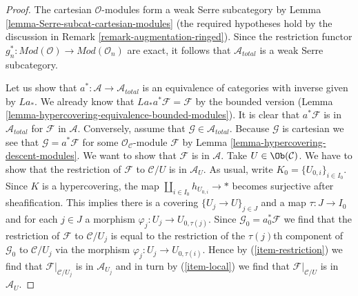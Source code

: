 \begin{proof}
The cartesian $\mathcal{O}$-modules form a weak Serre subcategory by
Lemma \ref{lemma-Serre-subcat-cartesian-modules}
(the required hypotheses hold by the discussion in
Remark \ref{remark-augmentation-ringed}).
Since the restriction functor
$g_n^* : \textit{Mod}(\mathcal{O}) \to \textit{Mod}(\mathcal{O}_n)$
are exact, it follows that $\mathcal{A}_{total}$ is a weak Serre
subcategory.

\medskip\noindent
Let us show that $a^* : \mathcal{A} \to \mathcal{A}_{total}$
is an equivalence of categories with inverse given by $La_*$.
We already know that $La_*a^*\mathcal{F} = \mathcal{F}$ by the
bounded version
(Lemma \ref{lemma-hypercovering-equivalence-bounded-modules}).
It is clear that $a^*\mathcal{F}$ is in $\mathcal{A}_{total}$
for $\mathcal{F}$ in $\mathcal{A}$. Conversely, assume that
$\mathcal{G} \in \mathcal{A}_{total}$. Because $\mathcal{G}$
is cartesian we see that $\mathcal{G} = a^*\mathcal{F}$
for some $\mathcal{O}_\mathcal{C}$-module $\mathcal{F}$ by
Lemma \ref{lemma-hypercovering-descent-modules}.
We want to show that $\mathcal{F}$ is in $\mathcal{A}$.
Take $U \in \Ob(\mathcal{C})$. We have to show that the
restriction of $\mathcal{F}$ to $\mathcal{C}/U$ is in $\mathcal{A}_U$.
As usual, write $K_0 = \{U_{0, i}\}_{i \in I_0}$.
Since $K$ is a hypercovering, the map $\coprod_{i \in I_0} h_{U_{0, i}} \to *$
becomes surjective after sheafification. This implies there is
a covering $\{U_j \to U\}_{j \in J}$ and a map $\tau : J \to I_0$
and for each $j \in J$ a morphism $\varphi_j : U_j \to U_{0, \tau(j)}$.
Since $\mathcal{G}_0 = a_0^*\mathcal{F}$ we find
that the restriction of $\mathcal{F}$ to $\mathcal{C}/U_j$
is equal to the restriction of the $\tau(j)$th component of
$\mathcal{G}_0$ to $\mathcal{C}/U_j$ via the morphism
$\varphi_j : U_j \to U_{0, \tau(i)}$. Hence by
(\ref{item-restriction}) we find that $\mathcal{F}|_{\mathcal{C}/U_j}$
is in $\mathcal{A}_{U_j}$ and in turn by
(\ref{item-local}) we find that $\mathcal{F}|_{\mathcal{C}/U}$
is in $\mathcal{A}_U$.


\end{proof}
